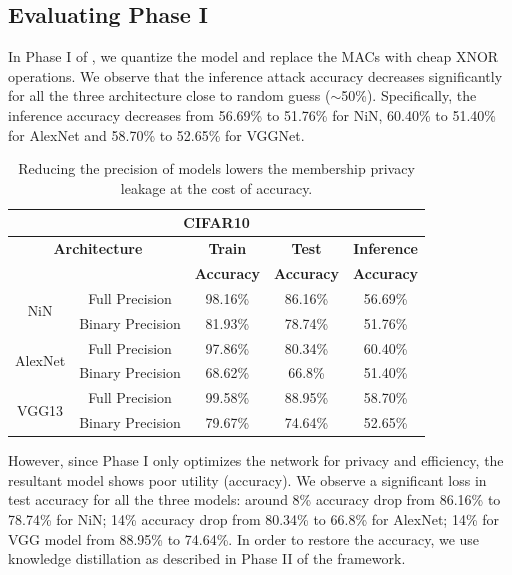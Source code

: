 

\subsection{Evaluating Phase I}
\label{evalPh1}

In Phase I of \method, we quantize the model and replace the MACs with cheap XNOR operations.
We observe that the inference attack accuracy decreases significantly for all the three architecture close to random guess ($\sim$50\%).
Specifically, the inference accuracy decreases from 56.69\% to 51.76\% for NiN, 60.40\% to 51.40\% for AlexNet and 58.70\% to 52.65\% for VGGNet.


\begin{table}[!htb]
\begin{center}
\renewcommand\arraystretch{1.5}
\fontsize{6.5pt}{6.5pt}\selectfont
\begin{tabular}{|c|c|c|c|c|}
\hline
\multicolumn{5}{|c|}{\textbf{CIFAR10}} \\
\hline
\multicolumn{2}{|c|}{\textbf{Architecture}} & \textbf{Train}  & \textbf{Test}  & \textbf{Inference}  \\
 \multicolumn{2}{|c|}{} & \textbf{Accuracy} & \textbf{Accuracy} & \textbf{Accuracy}  \\
\hline
\multirow{2}{*}{NiN} & Full Precision & 98.16\% & 86.16\% & \cellcolor{red!25}56.69\% \\
& Binary Precision & 81.93\% & 78.74\% & \cellcolor{green!25}51.76\% \\
\hline
\multirow{2}{*}{AlexNet} & Full Precision & 97.86\% & 80.34\% & \cellcolor{red!25}60.40\% \\
& Binary Precision & 68.62\% & 66.8\% & \cellcolor{green!25}51.40\% \\
\hline
\multirow{2}{*}{VGG13} & Full Precision & 99.58\% & 88.95\% & \cellcolor{red!25}58.70\%\\
& Binary Precision & 79.67\% & 74.64\% & \cellcolor{green!25}52.65\%\\
\hline
\end{tabular}
\end{center}
\caption{Reducing the precision of models lowers the membership privacy leakage at the cost of accuracy.}
\label{cifar10quant}
\vspace{-6mm}
\end{table}


However, since Phase I only optimizes the network for privacy and efficiency, the resultant model shows poor utility (accuracy).
We observe a significant loss in test accuracy for all the three models: around 8\% accuracy drop from 86.16\% to 78.74\% for NiN; 14\% accuracy drop from 80.34\% to 66.8\% for AlexNet; 14\% for VGG model from 88.95\% to 74.64\%.
In order to restore the accuracy, we use knowledge distillation as described in Phase II of the \method\hspace{0.02in} framework.


